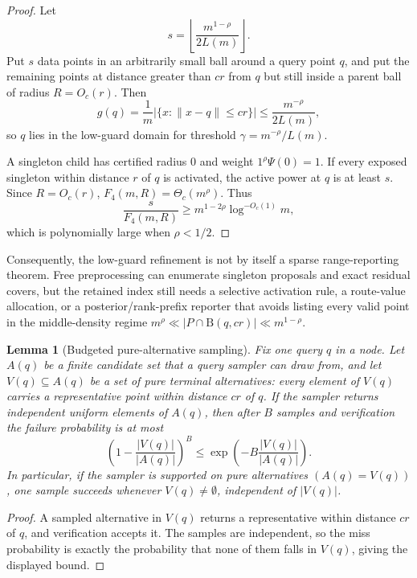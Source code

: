 \documentclass[10pt]{article}
\newtheorem{lemma}[theorem]{Lemma}
\theoremstyle{definition}
\newcommand{\Ball}{\mathrm{B}}
\begin{document}
\begin{proof}
   Let
   \[
      s=\left\lfloor \frac{m^{1-\rho}}{2L(m)}\right\rfloor .
   \]
   Put $s$ data points in an arbitrarily small ball around a query point $q$,
   and put the remaining points at distance greater than $cr$ from $q$ but
   still inside a parent ball of radius $R=O_c(r)$.  Then
   \[
      g(q)=\frac1m|\{x:\|x-q\|\le cr\}|
      \le \frac{m^{-\rho}}{2L(m)},
   \]
   so $q$ lies in the low-guard domain for threshold
   $\gamma=m^{-\rho}/L(m)$.

   A singleton child has certified radius $0$ and weight
   $1^\rho\Psi(0)=1$.  If every exposed singleton within distance $r$ of $q$
   is activated, the active power at $q$ is at least $s$.  Since
   $R=O_c(r)$, $F_4(m,R)=\Theta_c(m^\rho)$.  Thus
   \[
      \frac{s}{F_4(m,R)}
      \ge
      m^{1-2\rho}\log^{-O_c(1)}m,
   \]
   which is polynomially large when $\rho<1/2$.
\end{proof}

Consequently, the low-guard refinement is not by itself a sparse range-reporting
theorem.  Free preprocessing can enumerate singleton proposals and exact
residual covers, but the retained index still needs a selective activation rule,
a route-value allocation, or a posterior/rank-prefix reporter that avoids
listing every valid point in the middle-density regime
$m^\rho\ll |P\cap\Ball(q,cr)|\ll m^{1-\rho}$.

\begin{lemma}[Budgeted pure-alternative sampling]
   \label{lem:budgeted-pure-alternative-sampling}
   Fix one query $q$ in a node.  Let $A(q)$ be a finite candidate set that a
   query sampler can draw from, and let $V(q)\subseteq A(q)$ be a set of pure
   terminal alternatives: every element of $V(q)$ carries a representative
   point within distance $cr$ of $q$.  If the sampler returns independent
   uniform elements of $A(q)$, then after $B$ samples and verification the
   failure probability is at most
   \[
      \left(1-\frac{|V(q)|}{|A(q)|}\right)^B
      \le
      \exp\!\left(-B\frac{|V(q)|}{|A(q)|}\right).
   \]
   In particular, if the sampler is supported on pure alternatives
   $(A(q)=V(q))$, one sample succeeds whenever $V(q)\ne\emptyset$, independent
   of $|V(q)|$.
\end{lemma}

\begin{proof}
   A sampled alternative in $V(q)$ returns a representative within distance
   $cr$ of $q$, and verification accepts it.  The samples are independent, so
   the miss probability is exactly the probability that none of them falls in
   $V(q)$, giving the displayed bound.
\end{proof}
\end{document}
